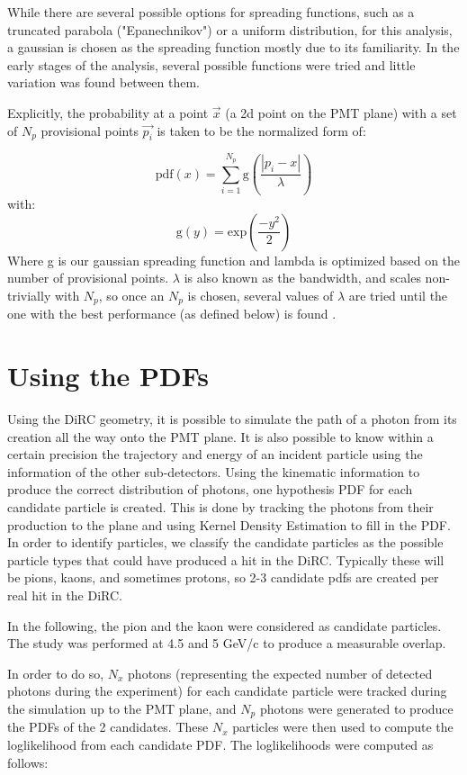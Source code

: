 \documentclass[11pt]{article}
\begin{document}
While there are several possible options for spreading functions, such as a truncated parabola ("Epanechnikov") or a uniform distribution, for this analysis, a gaussian is chosen as the spreading function mostly due to its familiarity.  In the early stages of the analysis, several possible functions were tried and little variation was found between them.  

Explicitly, the probability at a point $\vec{x}$ (a 2d point on the PMT plane)  with a set of $N_p$ provisional points $\vec{p_i}$ is taken to be the normalized form of:

\begin{equation}
\textrm{pdf}(x) = \sum\limits_{i=1}^{N_p} \textrm{g}(\frac{|p_i-x|}{\lambda})
\end{equation}
with:
\begin{equation}
\textrm{g}(y) = \textrm{exp}(\frac{-y^2}{2})
\end{equation}
Where g is our gaussian spreading function and lambda is optimized based on the number of provisional points.  $\lambda$ is also known as the bandwidth, and scales non-trivially with $N_p$, so once an $N_p$ is chosen, several values of $\lambda$ are tried until the one with the best performance (as defined below) is found \cite{SJOS:SJOS445}.

\section{Using the PDFs}
Using the DiRC geometry, it is possible to simulate the path of a photon from its creation all the way onto the PMT plane. It is also possible to know within a certain precision the trajectory and energy of an incident particle using the information of the other sub-detectors.  Using the kinematic information to produce the correct distribution of photons, one hypothesis PDF for each candidate particle is created.  This is done by tracking the photons from their production to the plane and using Kernel Density Estimation to fill in the PDF.  In order to identify particles, we classify the candidate particles as the possible particle types that could have produced a hit in the DiRC.  Typically these will be pions, kaons, and sometimes protons, so 2-3 candidate pdfs are created per real hit in the DiRC.

In the following, the pion and the kaon were considered as candidate particles. The study was performed at 4.5 and 5 GeV/c to produce a measurable overlap.  

In order to do so, $N_x$ photons (representing the expected number of detected photons during the experiment) for each candidate particle were tracked during the simulation up to the PMT plane, and $N_p$ photons were generated to produce the PDFs of the 2 candidates.  These $N_x$ particles were then used to compute the loglikelihood from each candidate PDF.  The loglikelihoods were computed as follows:
\end{document}
